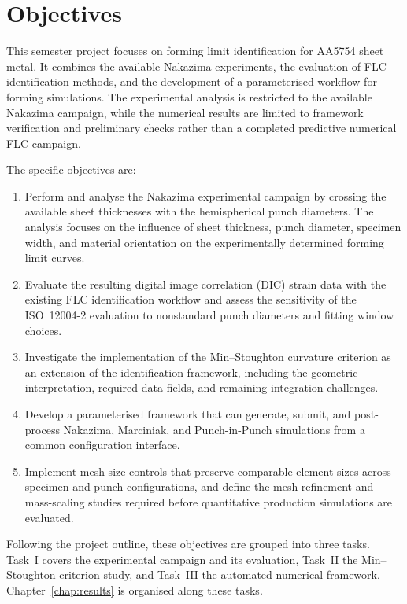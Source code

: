 \section{Objectives}

This semester project focuses on forming limit identification for AA5754 sheet
metal. It combines the available Nakazima experiments, the evaluation of FLC
identification methods, and the development of a parameterised
 workflow for forming simulations. The experimental
analysis is restricted to the available Nakazima campaign, while the numerical
results are limited to framework verification and preliminary checks rather
than a completed predictive numerical FLC campaign.

The specific objectives are:

\begin{enumerate}
  \item Perform and analyse the Nakazima experimental campaign by crossing the
  available sheet thicknesses with the hemispherical punch diameters. The
  analysis focuses on the influence of sheet thickness, punch diameter,
  specimen width, and material orientation on the experimentally determined
  forming limit curves.
  \item Evaluate the resulting digital image correlation (DIC) strain data with the existing FLC
  identification workflow and assess the sensitivity of the ISO~12004-2
  evaluation to nonstandard punch diameters and fitting window choices.
  \item Investigate the implementation of the Min--Stoughton curvature criterion
  as an extension of the identification framework, including the geometric
  interpretation, required  data fields, and remaining integration
  challenges.
  \item Develop a parameterised  framework that can generate,
  submit, and post-process Nakazima, Marciniak, and Punch-in-Punch simulations
  from a common configuration interface.
  \item Implement mesh size controls that preserve comparable element sizes
  across specimen and punch configurations, and define the mesh-refinement and
  mass-scaling studies required before quantitative production simulations are
  evaluated.
\end{enumerate}

Following the project outline, these objectives are grouped into three tasks.
Task~I covers the experimental campaign and its evaluation, Task~II the
Min--Stoughton criterion study, and Task~III the automated numerical
framework. Chapter~\ref{chap:results} is organised along these tasks.

